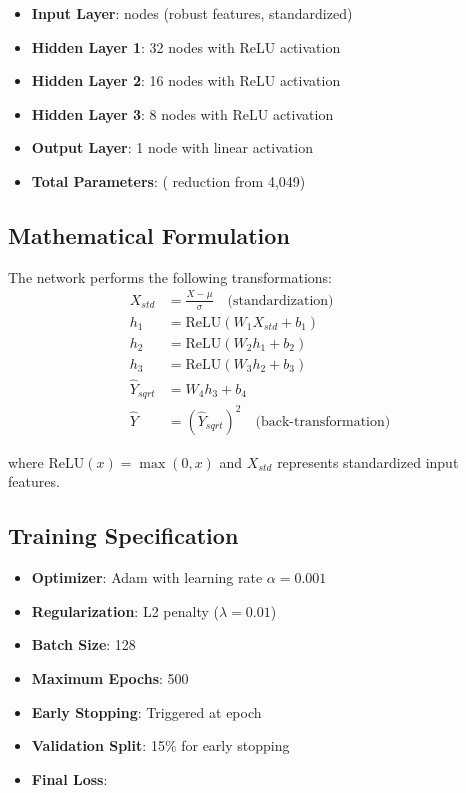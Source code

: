 \begin{itemize}
    \item \textbf{Input Layer}: \ModelTenInputDimension{} nodes (robust features, standardized)
    \item \textbf{Hidden Layer 1}: 32 nodes with ReLU activation
    \item \textbf{Hidden Layer 2}: 16 nodes with ReLU activation
    \item \textbf{Hidden Layer 3}: 8 nodes with ReLU activation
    \item \textbf{Output Layer}: 1 node with linear activation
    \item \textbf{Total Parameters}: \ModelTenTotalParams{} (\ModelTenParameterReduction{} reduction from 4,049)
\end{itemize}

\subsection{Mathematical Formulation}

The network performs the following transformations:
\begin{align}
X_{std} &= \frac{X - \mu}{\sigma} \quad \text{(standardization)} \\
h_1 &= \text{ReLU}(W_1 X_{std} + b_1) \\
h_2 &= \text{ReLU}(W_2 h_1 + b_2) \\
h_3 &= \text{ReLU}(W_3 h_2 + b_3) \\
\hat{Y}_{sqrt} &= W_4 h_3 + b_4 \\
\hat{Y} &= (\hat{Y}_{sqrt})^2 \quad \text{(back-transformation)}
\end{align}

where ReLU$(x) = \max(0, x)$ and $X_{std}$ represents standardized input features.

\subsection{Training Specification}

\begin{itemize}
    \item \textbf{Optimizer}: Adam with learning rate $\alpha = 0.001$
    \item \textbf{Regularization}: L2 penalty ($\lambda = 0.01$)
    \item \textbf{Batch Size}: 128
    \item \textbf{Maximum Epochs}: 500
    \item \textbf{Early Stopping}: Triggered at epoch \ModelTenEpochsStopped{}
    \item \textbf{Validation Split}: 15\% for early stopping
    \item \textbf{Final Loss}: \ModelTenTrainingLoss{}
\end{itemize}

